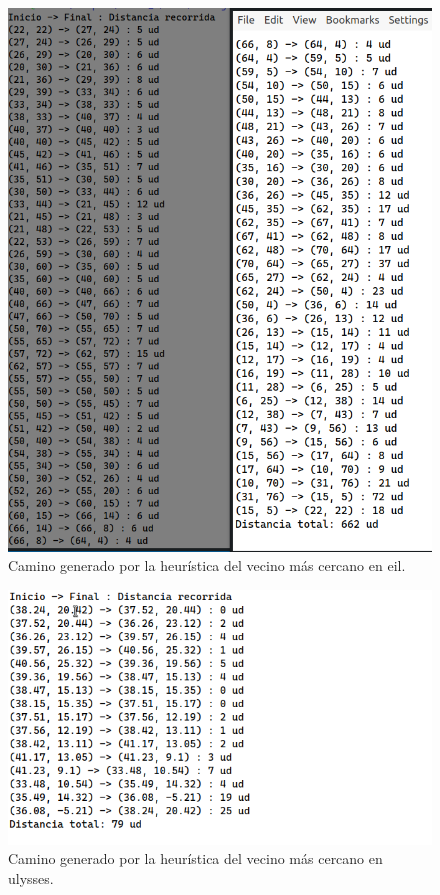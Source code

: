 \begin{figure}[H] 
  \centering
  \includegraphics[scale=0.5]{img/dist-vecinos-eil.png}
  \caption{Camino generado por la heurística del vecino más cercano en eil.}
\end{figure}

\begin{figure}[H] 
  \centering
  \includegraphics[scale=0.5]{img/dist-vecino-ulysses.png}
  \caption{Camino generado por la heurística del vecino más cercano en ulysses.}
\end{figure}

